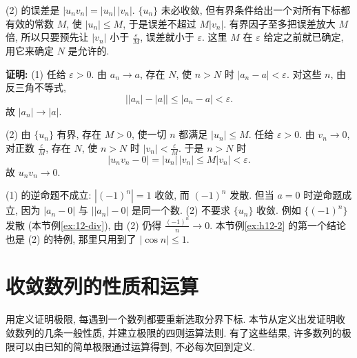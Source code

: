 \documentclass[UTF8,openany]{ctexbook}
\theoremstyle{chinesetextbook}
\newenvironment{cnproof}{\par\indent\textbf{证明:} \ignorespaces}{\par}
\begin{document}
(2) 的误差是 $|u_nv_n|=|u_n|\,|v_n|$. $\{u_n\}$ 未必收敛, 但有界条件给出一个对所有下标都有效的常数 $M$, 使 $|u_n|\le M$, 于是误差不超过 $M|v_n|$. 有界因子至多把误差放大 $M$ 倍, 所以只要预先让 $|v_n|$ 小于 $\displaystyle\frac\varepsilon M$, 误差就小于 $\varepsilon$. 这里 $M$ 在 $\varepsilon$ 给定之前就已确定, 用它来确定 $N$ 是允许的.
\begin{cnproof}
(1) 任给 $\varepsilon>0$. 由 $a_n\to a$, 存在 $N$, 使 $n>N$ 时 $|a_n-a|<\varepsilon$. 对这些 $n$, 由反三角不等式,
\[
\bigl||a_n|-|a|\bigr|\le|a_n-a|<\varepsilon.
\]
故 $|a_n|\to|a|$.

(2) 由 $\{u_n\}$ 有界, 存在 $M>0$, 使一切 $n$ 都满足 $|u_n|\le M$. 任给 $\varepsilon>0$. 由 $v_n\to0$, 对正数 $\displaystyle\frac\varepsilon M$, 存在 $N$, 使 $n>N$ 时 $\displaystyle|v_n|<\frac\varepsilon M$. 于是 $n>N$ 时
\[
|u_nv_n-0|=|u_n|\,|v_n|\le M|v_n|<\varepsilon.
\]
故 $u_nv_n\to0$.
\end{cnproof}
(1) 的逆命题不成立: $|(-1)^n|=1$ 收敛, 而 $(-1)^n$ 发散. 但当 $a=0$ 时逆命题成立, 因为 $|a_n-0|$ 与 $\bigl||a_n|-0\bigr|$ 是同一个数. (2) 不要求 $\{u_n\}$ 收敛. 例如 $\{(-1)^n\}$ 发散 (本节例\ref{ex:12-div}), 由 (2) 仍得 $\displaystyle\frac{(-1)^n}n\to0$. 本节例\ref{ex:h12-2} 的第一个结论也是 (2) 的特例, 那里只用到了 $|\cos n|\le1$.
\section{收敛数列的性质和运算}
用定义证明极限, 每遇到一个数列都要重新选取分界下标. 本节从定义出发证明收敛数列的几条一般性质, 并建立极限的四则运算法则. 有了这些结果, 许多数列的极限可以由已知的简单极限通过运算得到, 不必每次回到定义.
\end{document}
